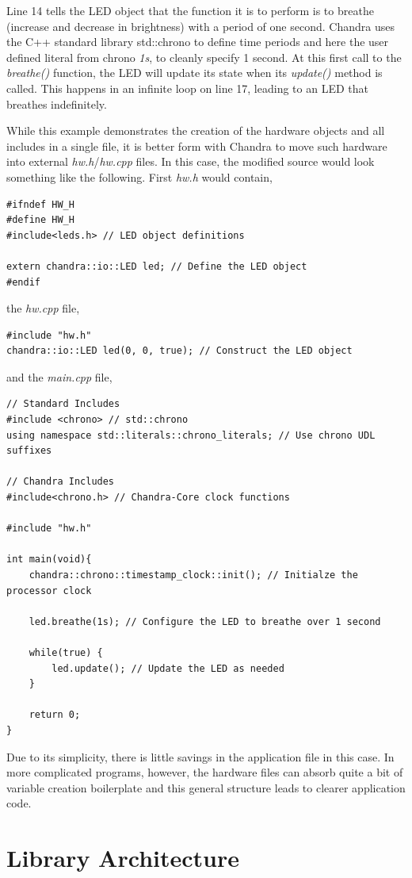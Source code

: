 \documentclass[10pt,letterpaper]{memoir} %
\begin{document}
Line 14 tells the LED object that the function it is to perform is to breathe (increase and decrease in brightness) with a period of one second.  Chandra uses the C++ standard library std::chrono to define time periods and here the user defined literal from chrono \emph{1s}, to cleanly specify 1 second.  At this first call to the \emph{breathe()} function, the LED will update its state when its \emph{update()} method is called.  This happens in an infinite loop on line 17, leading to an LED that breathes indefinitely.

While this example demonstrates the creation of the hardware objects and all includes in a single file, it is better form with Chandra to move such hardware into external \emph{hw.h}/\emph{hw.cpp} files.  In this case, the modified source would look something like the following.  First \emph{hw.h} would contain,
\begin{verbatim}
#ifndef HW_H
#define HW_H
#include<leds.h> // LED object definitions

extern chandra::io::LED led; // Define the LED object
#endif
\end{verbatim}
the \emph{hw.cpp} file,
\begin{verbatim}
#include "hw.h"
chandra::io::LED led(0, 0, true); // Construct the LED object
\end{verbatim}
and the \emph{main.cpp} file,
\begin{verbatim}
// Standard Includes
#include <chrono> // std::chrono
using namespace std::literals::chrono_literals; // Use chrono UDL suffixes

// Chandra Includes
#include<chrono.h> // Chandra-Core clock functions

#include "hw.h"

int main(void){
	chandra::chrono::timestamp_clock::init(); // Initialze the processor clock
	
	led.breathe(1s); // Configure the LED to breathe over 1 second
	
	while(true) {
		led.update(); // Update the LED as needed
	}
	
	return 0;
}
\end{verbatim}
Due to its simplicity, there is little savings in the application file in this case.  In more complicated programs, however, the hardware files can absorb quite a bit of variable creation boilerplate and this general structure leads to clearer application code.


\chapter{Library Architecture}
\end{document}
